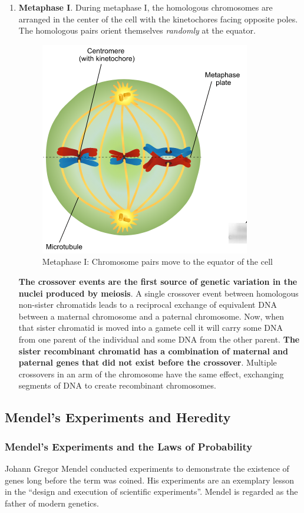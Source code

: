 \documentclass[12pt]{article}
\begin{document}
\begin{enumerate}
    \item \textbf{Metaphase I}. During metaphase I, the homologous chromosomes are arranged in the center of the cell with the kinetochores facing opposite poles. The homologous pairs orient themselves \emph{randomly} at the equator. 
\begin{figure}[h!]
    \centering
    \includegraphics[scale=0.4]{metaphase-I.png}
    \caption{Metaphase I: Chromosome pairs move to the equator of the cell}
    \label{fig: metaphase-I}
\end{figure}
        \textbf{The crossover events are the first source of genetic variation in the nuclei produced by meiosis}. A single crossover event between homologous non-sister chromatids leads to a reciprocal exchange of equivalent DNA between a maternal chromosome and a paternal chromosome. Now, when that sister chromatid is moved into a gamete cell it will carry some DNA from one parent of the individual and some DNA from the other parent. \textbf{The sister recombinant chromatid has a combination of maternal and paternal genes that did not exist before the crossover}. Multiple crossovers in an arm of the chromosome have the same effect, exchanging segments of DNA to create recombinant chromosomes.
\end{enumerate}


\newpage
\subsection{Mendel's Experiments and Heredity}

\subsubsection{Mendel's Experiments and the Laws of Probability}
Johann Gregor Mendel conducted experiments to demonstrate the existence of genes long before the term was coined. His experiments are an exemplary lesson in the ``design and execution of scientific experiments''. Mendel is regarded as the father of modern genetics.
\end{document}
